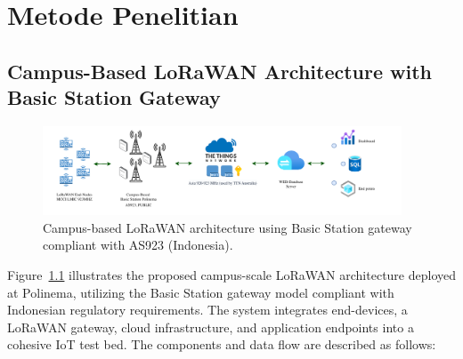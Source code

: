 \chapter{Metode Penelitian}

\section{Campus-Based LoRaWAN Architecture with Basic Station Gateway}
\label{subsec:campus_lorawan_architecture}

\begin{figure}[htbp]
    \centering
    \includegraphics[width=0.95\textwidth]{../figures/cb-iot-arch.drawio.pdf}
    \caption{Campus-based LoRaWAN architecture using Basic Station gateway compliant with AS923 (Indonesia).}
    \label{fig:campuslorawanarch}
\end{figure}

Figure~\ref{fig:campuslorawanarch} illustrates the proposed campus-scale LoRaWAN architecture deployed at Polinema, utilizing the Basic Station gateway model compliant with Indonesian regulatory requirements. The system integrates end-devices, a LoRaWAN gateway, cloud infrastructure, and application endpoints into a cohesive IoT test bed. The components and data flow are described as follows:

